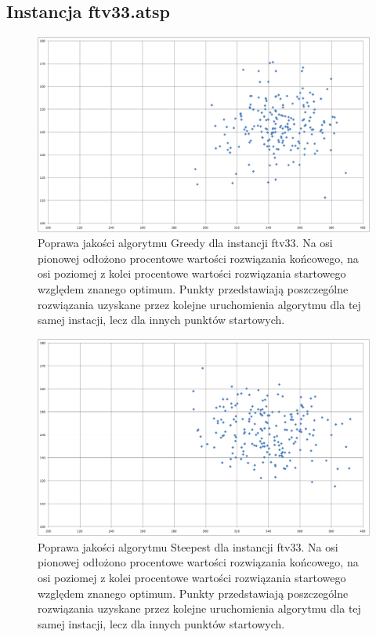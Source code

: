 \subsection{Instancja ftv33.atsp}
\begin{figure}[!h]
\centering\includegraphics[width=12cm]{img/ftv33_b2e_g.png}
\caption{Poprawa jakości algorytmu Greedy dla instancji ftv33. Na osi pionowej odłożono procentowe wartości rozwiązania końcowego, na osi poziomej z kolei procentowe wartości rozwiązania startowego względem znanego optimum. Punkty przedstawiają poszczególne rozwiązania uzyskane przez kolejne uruchomienia algorytmu dla tej samej instacji, lecz dla innych punktów startowych.}\label{rys:ftv33g}
\end{figure}
\begin{figure}[!h]
\centering\includegraphics[width=12cm]{img/ftv33_b2e_s.png}
\caption{Poprawa jakości algorytmu Steepest dla instancji ftv33. Na osi pionowej odłożono procentowe wartości rozwiązania końcowego, na osi poziomej z kolei procentowe wartości rozwiązania startowego względem znanego optimum. Punkty przedstawiają poszczególne rozwiązania uzyskane przez kolejne uruchomienia algorytmu dla tej samej instacji, lecz dla innych punktów startowych.}\label{rys:ftv33s}
\end{figure}

